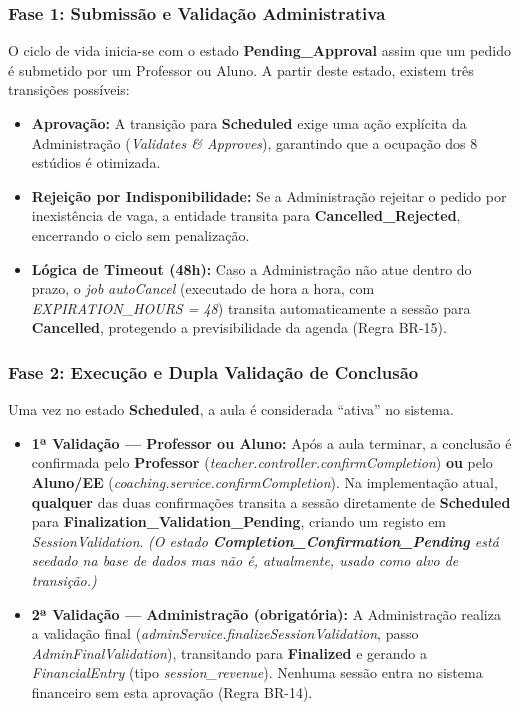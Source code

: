 \documentclass[12pt,a4paper]{report}
\begin{document}
\subsubsection{Fase 1: Submissão e Validação Administrativa}
O ciclo de vida inicia-se com o estado \textbf{Pending\_Approval} assim que um pedido é submetido por um Professor ou Aluno. A partir deste estado, existem três transições possíveis:
\begin{itemize}
    \item \textbf{Aprovação:} A transição para \textbf{Scheduled} exige uma ação explícita da Administração (\textit{Validates \& Approves}), garantindo que a ocupação dos 8 estúdios é otimizada.
    \item \textbf{Rejeição por Indisponibilidade:} Se a Administração rejeitar o pedido por inexistência de vaga, a entidade transita para \textbf{Cancelled\_Rejected}, encerrando o ciclo sem penalização.
    \item \textbf{Lógica de Timeout (48h):} Caso a Administração não atue dentro do prazo, o \textit{job} \textit{autoCancel} (executado de hora a hora, com \textit{EXPIRATION\_HOURS = 48}) transita automaticamente a sessão para \textbf{Cancelled}, protegendo a previsibilidade da agenda (Regra BR-15).
\end{itemize}

\subsubsection{Fase 2: Execução e Dupla Validação de Conclusão}
Uma vez no estado \textbf{Scheduled}, a aula é considerada ``ativa'' no sistema.
\begin{itemize}
    \item \textbf{1ª Validação — Professor ou Aluno:} Após a aula terminar, a conclusão é confirmada pelo \textbf{Professor} (\textit{teacher.controller.confirmCompletion}) \textbf{ou} pelo \textbf{Aluno/EE} (\textit{coaching.service.confirmCompletion}). Na implementação atual, \textbf{qualquer} das duas confirmações transita a sessão diretamente de \textbf{Scheduled} para \textbf{Finalization\_Validation\_Pending}, criando um registo em \textit{SessionValidation}. \textit{(O estado \textbf{Completion\_Confirmation\_Pending} está seedado na base de dados mas não é, atualmente, usado como alvo de transição.)}
    \item \textbf{2ª Validação — Administração (obrigatória):} A Administração realiza a validação final (\textit{adminService.finalizeSessionValidation}, passo \textit{AdminFinalValidation}), transitando para \textbf{Finalized} e gerando a \textit{FinancialEntry} (tipo \textit{session\_revenue}). Nenhuma sessão entra no sistema financeiro sem esta aprovação (Regra BR-14).
\end{itemize}
\end{document}
